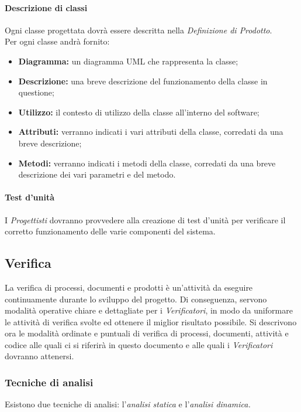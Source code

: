 \paragraph{Descrizione di classi\\}
Ogni classe progettata dovrà essere descritta nella \emph{Definizione di Prodotto}.
\\Per ogni classe andrà fornito:
\begin{itemize}
\item\textbf{Diagramma:} un diagramma UML\glossario{} che rappresenta la classe;
\item\textbf{Descrizione:} una breve descrizione del funzionamento della classe in questione;
\item\textbf{Utilizzo:} il contesto di utilizzo della classe all'interno del software;
\item\textbf{Attributi:} verranno indicati i vari attributi della classe, corredati da una breve descrizione;
\item\textbf{Metodi:} verranno indicati i metodi della classe, corredati da una breve descrizione dei vari parametri e del metodo.
\end{itemize}

\paragraph{Test d'unità\\}
\label{Test_unità_st}
I \emph{Progettisti} dovranno provvedere alla creazione di test d'unità per verificare il corretto funzionamento delle varie componenti del sistema.

\subsection{Verifica}
\label{verifica}
La verifica di processi, documenti e prodotti è un’attività da eseguire continuamente durante lo sviluppo del progetto. Di conseguenza, servono modalità operative chiare e dettagliate per i \textit{Verificatori}, in modo da uniformare le attività di verifica svolte ed ottenere il miglior risultato possibile. Si descrivono ora le modalità ordinate e puntuali di verifica di processi, documenti, attività e codice alle quali ci si riferirà in questo documento e alle quali i \textit{Verificatori} dovranno attenersi.

\subsubsection{Tecniche di analisi}
Esistono due tecniche di analisi: l'\textit{analisi statica} e l'\textit{analisi dinamica.}
